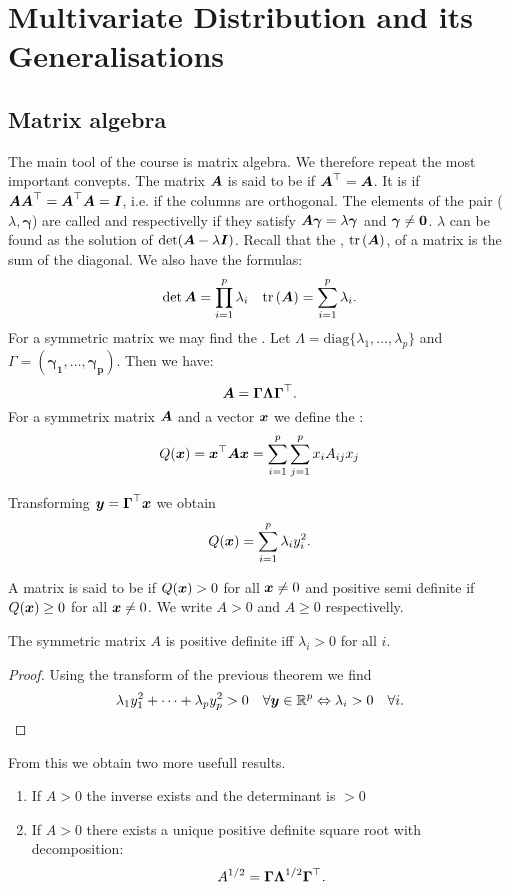 \section{Multivariate Distribution and its Generalisations}
\subsection{Matrix algebra}

The main tool of the course is matrix algebra. We therefore repeat the most important convepts. The matrix $\boldsymbol{A}$ is said to be  if $\boldsymbol{A}^\top=\boldsymbol{A}$. It is  if $\boldsymbol{A}\boldsymbol{A}^\top=\boldsymbol{A}^\top\boldsymbol{A}=\boldsymbol{I}$, i.e. if the columns are orthogonal. The elements of the pair ($\lambda, \boldsymbol{\gamma}$) are called  and  respectivelly if they satisfy $\boldsymbol{A}\boldsymbol{\gamma}=\lambda \boldsymbol{\gamma}$ and $\boldsymbol{\gamma}\ne \boldsymbol{0}$. $\lambda$ can be found as the solution of $\det(\boldsymbol{A}-\lambda \boldsymbol{I})$. Recall that the , $\mathrm{tr}\left(\boldsymbol{A}\right)$, of a matrix is the sum of the diagonal. We also have the formulas:
$$
    \det{\boldsymbol{A}} = \prod_{i=1}^p \lambda_i
    \quad
    \mathrm{tr}\left(\boldsymbol{A}\right) = \sum_{i=1}^p \lambda_i.
$$
For a symmetric matrix we may find the . Let $\Lambda = \textrm{diag}\{\lambda_1, \dots, \lambda_p\}$ and $\Gamma = (\boldsymbol{\gamma_1}, \dots, \boldsymbol{\gamma_p})$. Then we have:
$$
    \boldsymbol{A}=\boldsymbol{\Gamma}\boldsymbol{\Lambda}\boldsymbol{\Gamma}^\top.
$$
For a symmetrix matrix $\boldsymbol{A}$ and a vector $\boldsymbol{x}$ we define the :
$$
    Q(\boldsymbol{x}) = \boldsymbol{x}^\top \boldsymbol{A} \boldsymbol{x} = \sum_{i=1}^p\sum_{j=1}^p x_i A_{ij} x_j
$$
\begin{theorem}
    Transforming $\boldsymbol{y}=\boldsymbol{\Gamma}^\top\boldsymbol{x}$ we obtain 
    $$
        Q(\boldsymbol{x}) = \sum_{i=1}^p \lambda_i y_i^2.
    $$
\end{theorem}
A matrix is said to be  if $Q(\boldsymbol{x})>0$ for all $\boldsymbol{x}\ne0$ and positive semi definite if $Q(\boldsymbol{x})\geq0$ for all $\boldsymbol{x}\ne0$. We write $A>0$ and $A\geq 0$ respectivelly. 
\begin{theorem}
    The symmetric matrix $A$ is positive definite iff $\lambda_i > 0$ for all $i$.
\end{theorem}
\begin{proof}
    Using the transform of the previous theorem we find 
    $$
        \lambda_1 y_1^2 + \dots + \lambda_p y_p^2 > 0 \quad\forall \boldsymbol{y}\in\mathbb{R}^p \Leftrightarrow \lambda_i > 0 \quad\forall i. 
    $$
\end{proof}
From this we obtain two more usefull results. 
\begin{enumerate}
    \item If $A>0$ the inverse exists and the determinant is $>0$
    \item If $A>0$ there exists a unique positive definite square root with decomposition:
    $$
        A^{1/2} = \boldsymbol{\Gamma}\boldsymbol{\Lambda}^{1/2}\boldsymbol{\Gamma}^\top.
    $$
\end{enumerate}

